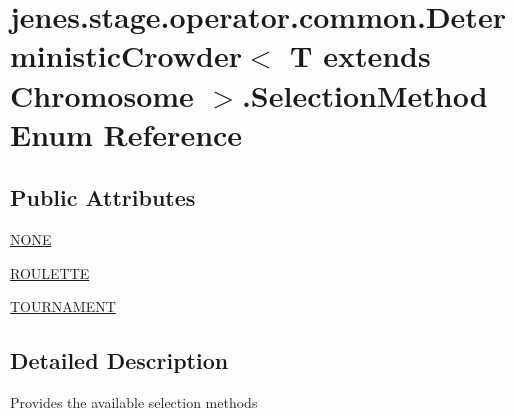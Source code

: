 \hypertarget{enumjenes_1_1stage_1_1operator_1_1common_1_1_deterministic_crowder_3_01_t_01extends_01_chromosome_01_4_1_1_selection_method}{\section{jenes.\-stage.\-operator.\-common.\-Deterministic\-Crowder$<$ T extends Chromosome $>$.Selection\-Method Enum Reference}
\label{enumjenes_1_1stage_1_1operator_1_1common_1_1_deterministic_crowder_3_01_t_01extends_01_chromosome_01_4_1_1_selection_method}
}
\subsection*{Public Attributes}
\begin{DoxyCompactItemize}
\item 
\hyperlink{enumjenes_1_1stage_1_1operator_1_1common_1_1_deterministic_crowder_3_01_t_01extends_01_chromosome_01_4_1_1_selection_method_a2a8afcf1f261f5f986a4f4400da3bc84}{N\-O\-N\-E}
\item 
\hyperlink{enumjenes_1_1stage_1_1operator_1_1common_1_1_deterministic_crowder_3_01_t_01extends_01_chromosome_01_4_1_1_selection_method_a09bdb68bda636b8eccf1f064dee57961}{R\-O\-U\-L\-E\-T\-T\-E}
\item 
\hyperlink{enumjenes_1_1stage_1_1operator_1_1common_1_1_deterministic_crowder_3_01_t_01extends_01_chromosome_01_4_1_1_selection_method_acf3d13065b946fb2e0e86d3cf8ca49fd}{T\-O\-U\-R\-N\-A\-M\-E\-N\-T}
\end{DoxyCompactItemize}


\subsection{Detailed Description}
Provides the available selection methods 

